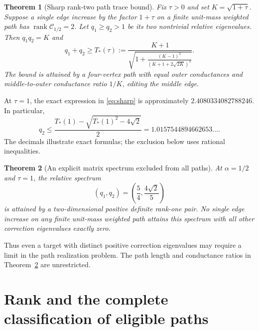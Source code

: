 \documentclass[11pt]{article}
\newtheorem{theorem}{Theorem}[section]
\newcommand{\rank}{\operatorname{rank}}
\begin{document}
\begin{theorem}[Sharp rank-two path trace bound]\label{thm:sharp}
Fix $\tau>0$ and set $K=\sqrt{1+\tau}$. Suppose a single edge increase
by the factor $1+\tau$ on a finite unit-mass weighted path has
$\rank\mathcal C_{1/2}=2$. Let $q_1\ge q_2>1$ be its two nontrivial
relative eigenvalues. Then $q_1q_2=K$ and
\begin{equation}\label{eq:sharp}
 q_1+q_2\ge T_*(\tau):=
 \frac{K+1}{\displaystyle\sqrt{1+
   \frac{(K-1)^2}{(K+1+2\sqrt{2K})^2}}}.
\end{equation}
The bound is attained by a four-vertex path with equal outer
conductances and middle-to-outer conductance ratio $1/K$, editing
the middle edge.
\end{theorem}

At $\tau=1$, the exact expression in \eqref{eq:sharp} is approximately
$2.4080334082788246$. In particular,
\begin{equation}\label{eq:q2numerical}
 q_2\le\frac{T_*(1)-\sqrt{T_*(1)^2-4\sqrt2}}2
       =1.0157544894662653\ldots.
\end{equation}
The decimals illustrate exact formulas; the exclusion below uses
rational inequalities.

\begin{theorem}[An explicit matrix spectrum excluded from all paths]
\label{thm:excluded}
At $\alpha=1/2$ and $\tau=1$, the relative spectrum
\begin{equation}\label{eq:target}
 (q_1,q_2)=\left(\frac54,\frac{4\sqrt2}{5}\right)
\end{equation}
is attained by a two-dimensional positive definite rank-one pair.
No single edge increase on any finite unit-mass weighted path attains
this spectrum with all other correction eigenvalues exactly zero.
\end{theorem}

Thus even a target with distinct positive correction eigenvalues
may require a limit in the path realization problem. The path length
and conductance ratios in Theorem~\ref{thm:excluded} are unrestricted.

\section{Rank and the complete classification of eligible paths}
\end{document}

